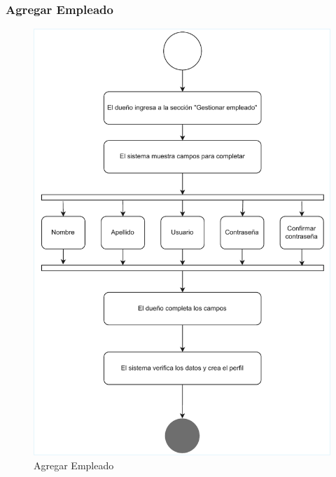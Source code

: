 \documentclass[twoside]{article}
\begin{document}
\subsubsection{Agregar Empleado}
\begin{figure}[!h]
    \centering
    \includegraphics[scale=1]{activity1.pdf}
    \caption{Agregar Empleado}
    \label{fig:enter-label}
\end{figure}

\newpage
\end{document}
